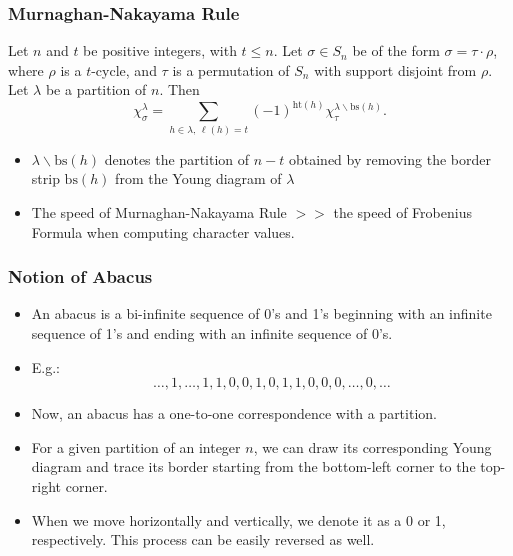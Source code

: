 \documentclass{beamer}
\begin{document}
\begin{frame}
\frametitle{Murnaghan-Nakayama Rule}
\begin{theorem}
Let $n$ and $t$ be positive integers, with $t \leq n$. Let $\sigma \in S_n$ be of the form $\sigma = \tau \cdot \rho$, where $\rho$ is a $t$-cycle, and $\tau$ is a permutation of $S_n$ with support disjoint from $\rho$. Let $\lambda$ be a partition of $n$. Then
\begin{equation*}
    \chi^{\lambda}_{\sigma} = \sum_{h \in \lambda, \, \ell(h) = t} (-1)^{\text{ht}(h)} \chi^{\lambda \backslash \text{bs}(h)}_{\tau}.
\end{equation*}
\end{theorem}

\begin{itemize}
    \item $\lambda \backslash \text{bs}(h)$ denotes the partition of $n - t$ obtained by removing the border strip $\text{bs}(h)$ from the Young diagram of $\lambda$
    \item The speed of Murnaghan-Nakayama Rule $>>$ the speed of Frobenius Formula when computing character values.
\end{itemize}
\end{frame}



\begin{frame}
\frametitle{Notion of Abacus}
\begin{itemize}
    \item An abacus is a bi-infinite sequence of 0’s and 1’s beginning with an infinite sequence of 1’s and ending with an infinite sequence of 0’s. 
    \item E.g.: \[ \ldots, 1, \ldots, 1, 1, 0, 0, 1, 0, 1, 1, 0, 0, 0, \ldots, 0, \ldots \]
    \item Now, an abacus has a one-to-one correspondence with a partition. 
    \item For a given partition of an integer $n$, we can draw its corresponding Young diagram and trace its border starting from the bottom-left corner to the top-right corner. 
    \item When we move horizontally and vertically, we denote it as a 0 or 1, respectively. This process can be easily reversed as well. 
\end{itemize}
\end{frame}
\end{document}
